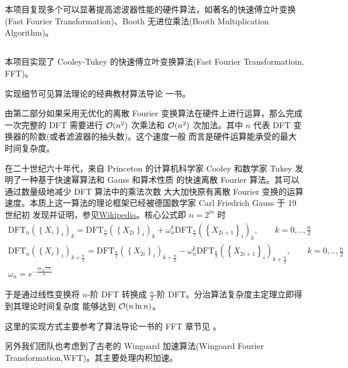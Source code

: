 \section{}
本项目复现多个可以显著提高滤波器性能的硬件算法，如著名的快速傅立叶变换(Fast Fourier Transformation)、Booth
无进位乘法(Booth Multiplication Algorithm)。
\subsection{}

本项目实现了 Cooley-Tukey 的快速傅立叶变换算法(Fast Fourier Transformatioin, FFT)。

实现细节可见算法理论的经典教材算法导论\cite[Chap30]{Cormen2022} 一书。

由第二部分如果采用无优化的离散 Fourier 变换算法在硬件上进行运算，那么完成一次完整的 DFT 需要进行
$\mathcal{O} (n^2)$ 次乘法和 $\mathcal{O}(n^2)$ 次加法。其中 $n$ 代表 DFT 变换器的阶数(或者滤波器的抽头数)。这个速度一般
而言是硬件运算能承受的最大时间复杂度。

在二十世纪六十年代，来自 Princeton 的计算机科学家 Cooley 和数学家 Tukey 发明了一种基于快速幂算法和 Gauss 和算术性质
的快速离散 Fourier 算法。其可以通过数量级地减少 DFT 算法中的乘法次数
大大加快原有离散 Fourier 变换的运算速度。本质上这一算法的理论框架已经被德国数学家 Carl Friedrich Gauss 于 19世纪初
发现并证明，参见\href{https://en.wikipedia.org/wiki/Cooley–Tukey_FFT_algorithm}{Wikipedia}。核心公式即
 $n= 2^m$ 时
\begin{eqnarray*}
    \mathrm{DFT}_{n}(\left\{X_i\right\}_i )_k =  
    \mathrm{DFT}_{\frac{n}{2}}(\left\{X_{2i}\right\}_i )_k + \omega_n^{k} 
    \mathrm{DFT}_{\frac{n}{2}}(\left\{X_{2i+1}\right\}_i )_k,\qquad k=0,..,\frac{n}{2}\\
    \mathrm{DFT}_{n}(\left\{X_i\right\}_i )_{k+\frac{n}{2}} =  
    \mathrm{DFT}_{\frac{n}{2}}(\left\{X_{2i}\right\}_i )_{k+\frac{n}{2}} - \omega_n^{k} 
    \mathrm{DFT}_{\frac{n}{2}}(\left\{X_{2i+1}\right\}_i )_{k+\frac{n}{2}},\qquad k=0,..,\frac{n}{2}\\
    \omega_n = e^{-\frac{2\pi \sqrt{-1}}{n}}
\end{eqnarray*}

于是通过线性变换将 $n$-阶 DFT 转换成 $\frac{n}{2}$-阶 DFT。分治算法复杂度主定理立即得到其理论时间复杂度
能够达到 $\mathcal{O} (n \ln n)$。

这里的实现方式主要参考了算法导论一书的 FFT 章节见 \cite[Polynomials and FFT]{Cormen2022}。

另外我们团队也考虑到了古老的 Wingoard 加速算法(Wingoard Fourier Transformation,WFT)。其主要处理内积加速。

